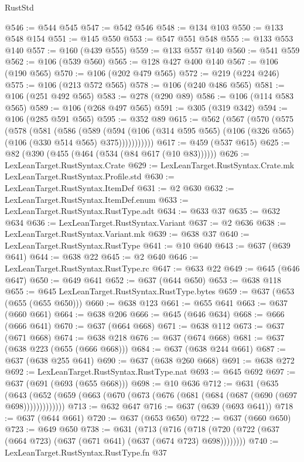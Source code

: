 \begin{lexlean}{RustStd}
\begin{coremodule}
@546 := @544 @545
@547 := @542 @546
@548 := @134 @103
@550 := @133 @548 @154
@551 := @145 @550
@553 := @547 @551 @548
@555 := @133 @553 @140
@557 := @160 (@439 @555)
@559 := @133 @557 @140
@560 := @541 @559
@562 := @106 (@539 @560)
@565 := @128 @427 @400 @140
@567 := @106 (@190 @565)
@570 := @106 (@202 @479 @565)
@572 := @219 (@224 @246)
@575 := @106 (@213 @572 @565)
@578 := @106 (@240 @486 @565)
@581 := @106 (@251 @492 @565)
@583 := @278 (@290 @89)
@586 := @106 (@114 @583 @565)
@589 := @106 (@268 @497 @565)
@591 := @305 (@319 @342)
@594 := @106 (@285 @591 @565)
@595 := @352 @89
@615 := @562
    (@567
      (@570
        (@575
          (@578
            (@581
              (@586
                (@589
                  (@594
                    (@106 (@314 @595 @565) (@106 (@326 @565) (@106 (@330 @514 @565) @375)))))))))))
@617 := @459 (@537 @615)
@625 := @82 (@390 (@455 (@464 (@534 (@84 @617 (@10 @83))))))
@626 := LexLeanTarget.RustSyntax.Crate
@629 := LexLeanTarget.RustSyntax.Crate.mk LexLeanTarget.RustSyntax.Profile.std
@630 := LexLeanTarget.RustSyntax.ItemDef
@631 := @2 @630
@632 := LexLeanTarget.RustSyntax.ItemDef.enum
@633 := LexLeanTarget.RustSyntax.RustType.adt
@634 := @633 @37
@635 := @632 @634
@636 := LexLeanTarget.RustSyntax.Variant
@637 := @2 @636
@638 := LexLeanTarget.RustSyntax.Variant.mk
@639 := @638 @37
@640 := LexLeanTarget.RustSyntax.RustType
@641 := @10 @640
@643 := @637 (@639 @641)
@644 := @638 @22
@645 := @2 @640
@646 := LexLeanTarget.RustSyntax.RustType.rc
@647 := @633 @22
@649 := @645 (@646 @647)
@650 := @649 @641
@652 := @637 (@644 @650)
@653 := @638 @118
@655 := @645 LexLeanTarget.RustSyntax.RustType.bytes
@659 := @637 (@653 (@655 (@655 @650)))
@660 := @638 @123
@661 := @655 @641
@663 := @637 (@660 @661)
@664 := @638 @206
@666 := @645 (@646 @634)
@668 := @666 (@666 @641)
@670 := @637 (@664 @668)
@671 := @638 @112
@673 := @637 (@671 @668)
@674 := @638 @218
@676 := @637 (@674 @668)
@681 := @637 (@638 @223 (@655 (@666 @668)))
@684 := @637 (@638 @244 @661)
@687 := @637 (@638 @255 @641)
@690 := @637 (@638 @260 @668)
@691 := @638 @272
@692 := LexLeanTarget.RustSyntax.RustType.nat
@693 := @645 @692
@697 := @637 (@691 (@693 (@655 @668)))
@698 := @10 @636
@712 := @631
    (@635 (@643 (@652 (@659 (@663 (@670 (@673 (@676 (@681 (@684 (@687 (@690 (@697 @698)))))))))))))
@713 := @632 @647
@716 := @637 (@639 (@693 @641))
@718 := @637 (@644 @661)
@720 := @637 (@653 @650)
@722 := @637 (@660 @650)
@723 := @649 @650
@738 := @631
    (@713 (@716 (@718 (@720 (@722 (@637 (@664 @723) (@637 (@671 @641) (@637 (@674 @723) @698))))))))
@740 := LexLeanTarget.RustSyntax.RustType.fn @37

\end{coremodule}
\end{lexlean}
